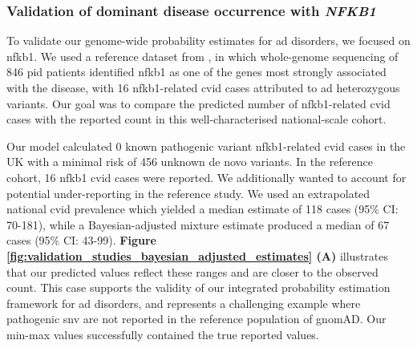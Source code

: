 \subsubsection{Validation of dominant disease occurrence with \textit{NFKB1}}

To validate our genome-wide probability estimates for \ac{ad} disorders, we focused on \ac{nfkb1}.
We used a reference dataset from \citet{tuijnenburgNFKB12018}, in which whole-genome sequencing of 846 \ac{pid} patients identified \ac{nfkb1} as one of the genes most strongly associated with the disease, with 16 \ac{nfkb1}-related \ac{cvid} cases attributed to \ac{ad} heterozygous variants. 
Our goal was to compare the predicted number of \ac{nfkb1}-related \ac{cvid} cases with the reported count in this well-characterised national-scale cohort.

Our model calculated 0 known pathogenic variant \ac{nfkb1}-related \ac{cvid} cases in the UK with a minimal risk of 456 unknown de novo variants. In the reference cohort, 16 \ac{nfkb1} \ac{cvid} cases were reported. 
We additionally wanted to account for potential under-reporting in the reference study. 
We used an extrapolated national \ac{cvid} prevalence which yielded a median estimate of 118 cases (95\% CI: 70-181), while a Bayesian-adjusted mixture estimate produced a median of 67 cases (95\% CI: 43-99). \textbf{Figure \ref{fig:validation_studies_bayesian_adjusted_estimates} (A)} illustrates that our predicted values reflect these ranges and are closer to the observed count. 
This case supports the validity of our integrated probability estimation framework for \ac{ad} disorders, and represents a challenging example where pathogenic \ac{snv} are not reported in the reference population of gnomAD. Our min-max values successfully contained the true reported values.

